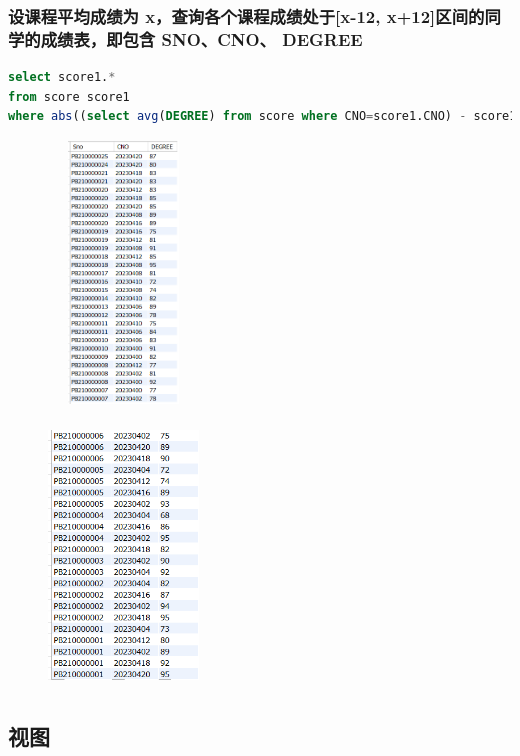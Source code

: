 \documentclass{ctexart}
\begin{document}
\subsubsection{设课程平均成绩为 x，查询各个课程成绩处于[x-12, x+12]区间的同学的成绩表，即包含 SNO、CNO、 DEGREE}
\begin{lstlisting}[language=sql]
select score1.*
from score score1
where abs((select avg(DEGREE) from score where CNO=score1.CNO) - score1.DEGREE) <= 12;

\end{lstlisting}
\begin{figure}[H]
	\centering 
	\includegraphics[height=7cm,width=4cm]{44.png}
	\end{figure}
	\begin{figure}[H]
		\centering 
		\includegraphics[height=7cm,width=4cm]{45.png}
		\end{figure}
\subsection{视图}
\end{document}
